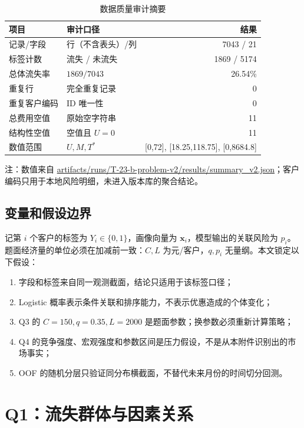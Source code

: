 \documentclass[UTF8,a4paper,11pt]{ctexart}
\newcommand{\code}[1]{\url{#1}}
\begin{document}
\begin{table}[H]
\centering
\caption{数据质量审计摘要}
\label{tab:quality-v2}
\begin{tabular}{@{}llr@{}}
\toprule
项目&审计口径&结果\\
\midrule
记录/字段&行（不含表头）/列&7043 / 21\\
标签计数&流失 / 未流失&1869 / 5174\\
总体流失率&\(1869/7043\)&26.54\%\\
重复行&完全重复记录&0\\
重复客户编码&ID 唯一性&0\\
总费用空值&原始空字符串&11\\
结构性空值&空值且 \(U=0\)&11\\
数值范围&\(U,M,T^*\)&[0,72], [18.25,118.75], [0,8684.8]\\
\bottomrule
\end{tabular}
\begin{tablenotes}
\footnotesize\item 注：数值来自 \code{artifacts/runs/T-23-b-problem-v2/results/summary_v2.json}；客户编码只用于本地风险明细，未进入版本库的聚合结论。
\end{tablenotes}
\end{table}

\subsection{变量和假设边界}
记第 \(i\) 个客户的标签为 \(Y_i\in\{0,1\}\)，画像向量为 \(\boldsymbol{x}_i\)，模型输出的关联风险为 \(p_i\)。题面经济量的单位必须在加减前一致：\(C,L\) 为元/客户，\(q,p_i\) 无量纲。本文锁定以下假设：
\begin{enumerate}[label=\textbf{A\arabic*}.,leftmargin=2.5em]
  \item 字段和标签来自同一观测截面，结论只适用于该标签口径；
  \item Logistic 概率表示条件关联和排序能力，不表示优惠造成的个体变化；
  \item Q3 的 \(C=150,q=0.35,L=2000\) 是题面参数；换参数必须重新计算策略；
  \item Q4 的竞争强度、宏观强度和参数区间是压力假设，不是从本附件识别出的市场事实；
  \item OOF 的随机分层只验证同分布横截面，不替代未来月份的时间切分回测。
\end{enumerate}

\section{Q1：流失群体与因素关系}
\label{sec:q1-v2}
\end{document}
